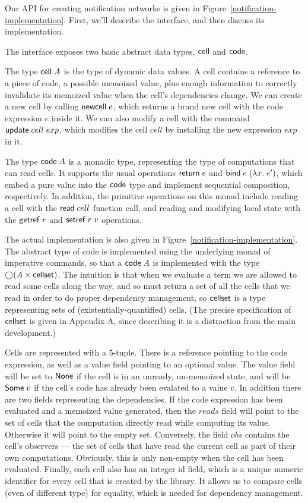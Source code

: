 \documentclass[preprint,natbib]{sigplanconf}
\begin{document}
Our API for creating notification networks is given in
Figure~\ref{notification-implementation}. First, we'll describe
the interface, and then discuss its implementation. 

The interface exposes two basic abstract data types, $\mbox{\textsf{{cell}}}$
and $\mbox{\textsf{{code}}}$.

The type $\mbox{\textsf{{cell}}}\;{A}$ is the type of dynamic data values. A cell
contains a reference to a piece of code, a possible memoized value,
plus enough information to correctly invalidate its memoized value
when the cell's dependencies change. We can create a new cell by
calling $\mbox{\textsf{{newcell}}}\;e$, which returns a brand new cell with the
code expression $e$ inside it. We can also modify a cell with 
the command $\mbox{\textsf{{update}}}\;cell\;exp$, which modifies the cell
$cell$ by installing the new expression $exp$ in it. 

The type $\mbox{\textsf{{code}}}\;{A}$ is a monadic type, representing the type of
computations that can read cells. It supports the usual operations
$\mbox{\textsf{{return}}}\; e$ and $\mbox{\textsf{{bind}}}\; e\; (\lambda x.\;e')$, which embed a pure value
into the $\mbox{\textsf{{code}}}$ type and implement sequential composition,
respectively. In addition, the primitive operations on this monad 
include reading a cell with the $\mbox{\textsf{{read}}}\; cell$ function call, and 
reading and modifying local state with the $\mbox{\textsf{{getref}}}\; r$ and $\mbox{\textsf{{setref}}}\; r\;v$
operations. 
 
The actual implementation is also given in
Figure~\ref{notification-implementation}. The abstract type of code is
implemented using the underlying monad of imperative commands, so that
a $\mbox{\textsf{{code}}}\;{A}$ is implemented with the type $\bigcirc{(A \times
  \mbox{\textsf{{cellset}}})}$.  The intuition is that when we evaluate a term we are
allowed to read some cells along the way, and so must return a set of
all the cells that we read in order to do proper dependency
management, so $\mbox{\textsf{{cellset}}}$ is a type representing sets of
(existentially-quantified) cells.  (The precise specification of
$\mbox{\textsf{{cellset}}}$ is given in Appendix A, since describing it is a
distraction from the main development.)

Cells are represented with a 5-tuple. There is a reference pointing to
the code expression, as well as a value field pointing to an optional
value. The value field will be set to $\mbox{\textsf{{None}}}$ if the cell is in
an unready, un-memoized state, and will be $\mbox{\textsf{{Some}}}\;v$ if the
cell's code has already been evalated to a value $v$. In addition there are
two fields representing the dependencies. If the code expression has
been evaluated and a memoized value generated, then the $reads$ field
will point to the set of cells that the computation directly read
while computing its value. Otherwise it will point to the empty
set. Conversely, the field $obs$ contains the cell's observers --- the
set of cells that have read the current cell as part of their own
computations. Obviously, this is only non-empty when the cell has been
evaluated. Finally, each cell also has an integer id field, which is a
unique numeric identifier for every cell that is created by the
library. It allows us to compare cells (even of different type) for
equality, which is needed for dependency management.
\end{document}
